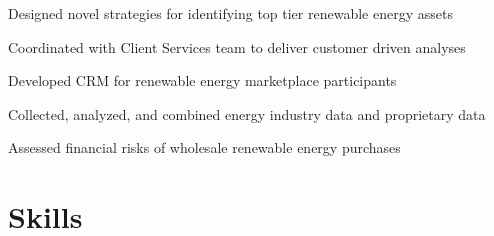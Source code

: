 \documentclass[]{deedy-resume-openfont}
\begin{document}
\begin{minipage}[t]{0.66\textwidth}
\begin{tightemize}
\item Designed novel strategies for identifying top tier renewable energy assets
\item Coordinated with Client Services team to deliver customer driven analyses
\item Developed CRM for renewable energy marketplace participants
\item Collected, analyzed, and combined energy industry data and proprietary data
\item Assessed financial risks of wholesale renewable energy purchases
\end{tightemize}
\sectionsep





\section{Skills}


\end{minipage}
\end{document}
